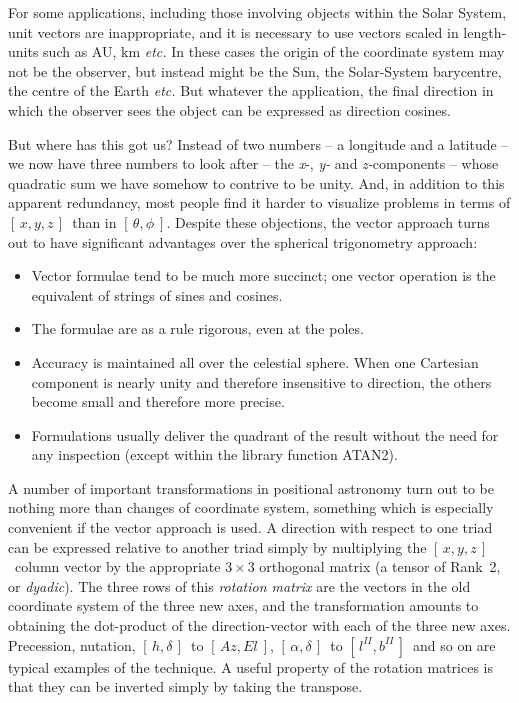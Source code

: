 \documentclass[11pt,twoside,nolof]{starlink}
\providecommand{\radec}     {$[\,\alpha,\delta\,]$}
\providecommand{\hadec}     {$[\,h,\delta\,]$}
\providecommand{\azel}      {$[\,Az,El~]$}
\providecommand{\gal}       {$[\,l^{I\!I},b^{I\!I}\,]$}
\providecommand{\xyz}       {$[\,x,y,z\,]$}
\begin{document}
For some applications, including those involving objects
within the Solar System, unit vectors are inappropriate, and
it is necessary to use vectors scaled in length-units such as
AU, km \textit{etc.}
In these cases the origin of the coordinate system may not be
the observer, but instead might be the Sun, the Solar-System
barycentre, the centre of the Earth \textit{etc.}  But whatever the application,
the final direction in which the observer sees the object can be
expressed as direction cosines.

But where has this got us?  Instead of two numbers -- a longitude and
a latitude -- we now have three numbers to look after
-- the \textit{x}-, \textit{y-} and
\textit{z-}components -- whose quadratic sum we have somehow to contrive to
be unity.  And, in addition to this apparent redundancy,
most people find it harder to visualize
problems in terms of \xyz\ than in $[\,\theta,\phi~]$.
Despite these objections, the vector approach turns out to have
significant advantages over the spherical trigonometry approach:
\begin{itemize}
\item Vector formulae tend to be much more succinct;  one vector
      operation is the equivalent of strings of sines and cosines.
\item The formulae are as a rule rigorous, even at the poles.
\item Accuracy is maintained all over the celestial sphere.
      When one Cartesian component is nearly unity and
      therefore insensitive to direction, the others become small
      and therefore more precise.
\item Formulations usually deliver the quadrant of the result
      without the need for any inspection (except within the
      library function ATAN2).
\end{itemize}
A number of important transformations in positional
astronomy turn out to be nothing more than changes of coordinate
system, something which is especially convenient if
the vector approach is used.  A direction with respect
to one triad can be expressed relative to another triad simply
by multiplying the \xyz\ column vector by the appropriate
$3\times3$ orthogonal matrix
(a tensor of Rank~2, or \textit{dyadic}).  The three rows of this
\textit{rotation matrix}\/
are the vectors in the old coordinate system of the three
new axes, and the transformation amounts to obtaining the
dot-product of the direction-vector with each of the three
new axes.  Precession, nutation, \hadec\ to \azel,
\radec\ to \gal\ and so on are typical examples of the
technique.  A useful property of the rotation matrices
is that they can be inverted simply by taking the transpose.
\end{document}
